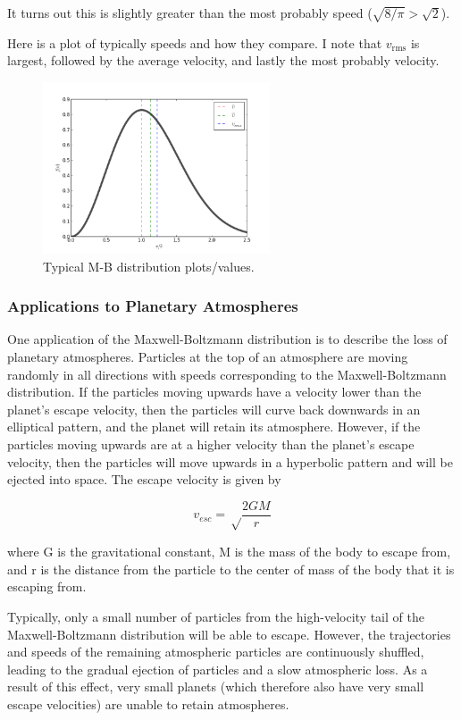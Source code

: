 \documentclass{article}
\begin{document}
It turns out this is slightly greater than the most probably speed ($\sqrt{8/\pi} > \sqrt{2}$).

Here is a plot of typically speeds and how they compare. I note that $v_\text{rms}$ is largest, followed by the average velocity, and lastly the most probably velocity. 

\begin{figure}[ht]
    \centering
    \includegraphics[width=0.6\textwidth]{figures/mbdist.png}
    \caption{Typical M-B distribution plots/values.}
    \label{fig:mwdist}
\end{figure}

\subsubsection{Applications to Planetary Atmospheres}
One application of the Maxwell-Boltzmann distribution is to describe the loss of planetary atmospheres. Particles at the top of an atmosphere are moving randomly in all directions with speeds corresponding to the Maxwell-Boltzmann distribution. If the particles moving upwards have a velocity lower than the planet's escape velocity, then the particles will curve back downwards in an elliptical pattern, and the planet will retain its atmosphere. However, if the particles moving upwards are at a higher velocity than the planet's escape velocity, then the particles will move upwards in a hyperbolic pattern and will be ejected into space. The escape velocity is given by

$$ v_{esc} = \sqrt\frac{2GM}{r} $$

where G is the gravitational constant, M is the mass of the body to escape from, and r is the distance from the particle to the center of mass of the body that it is escaping from.

Typically, only a small number of particles from the high-velocity tail of the Maxwell-Boltzmann distribution will be able to escape. However, the trajectories and speeds of the remaining atmospheric particles are continuously shuffled, leading to the gradual ejection of particles and a slow atmospheric loss. As a result of this effect, very small planets (which therefore also have very small escape velocities) are unable to retain atmospheres.
\end{document}

